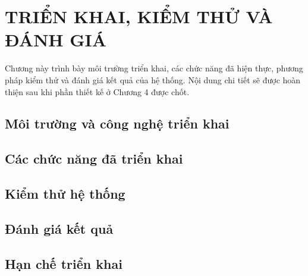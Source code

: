 \chapter{TRIỂN KHAI, KIỂM THỬ VÀ ĐÁNH GIÁ}

Chương này trình bày môi trường triển khai, các chức năng đã hiện thực, phương pháp kiểm thử và đánh giá kết quả của hệ thống. Nội dung chi tiết sẽ được hoàn thiện sau khi phần thiết kế ở Chương 4 được chốt.

\section{Môi trường và công nghệ triển khai}



\section{Các chức năng đã triển khai}


\section{Kiểm thử hệ thống}


\section{Đánh giá kết quả}


\section{Hạn chế triển khai}

